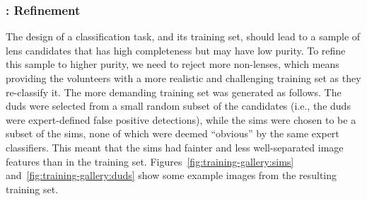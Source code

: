 \documentclass[useAMS,usenatbib,a4paper]{mn2e}
\begin{document}
\subsubsection{\StageTwo: Refinement}
\label{sec:design:stages:two}

The design of a \StageOne classification task, and its training set, should
lead to a sample of lens candidates that has high completeness but may have low
purity. To refine this sample to higher purity, we need to reject more
non-lenses, which means providing the volunteers with a more realistic and
challenging training set as they re-classify it. The more demanding \StageTwo
training set was generated as follows. The \StageTwo duds were selected
from a small random subset of the \StageOne candidates (i.e., the \StageTwo duds
were expert-defined \StageOne false positive detections), while the \StageTwo
sims were chosen to be a subset of the \StageOne sims, none of which were deemed
``obvious'' by the same expert classifiers. This meant that the \StageTwo sims
had fainter and less well-separated image features than in the \StageOne
training set.  Figures~\ref{fig:training-gallery:sims}
and~\ref{fig:training-gallery:duds} show some example images from the resulting
\StageTwo training set.
\end{document}
